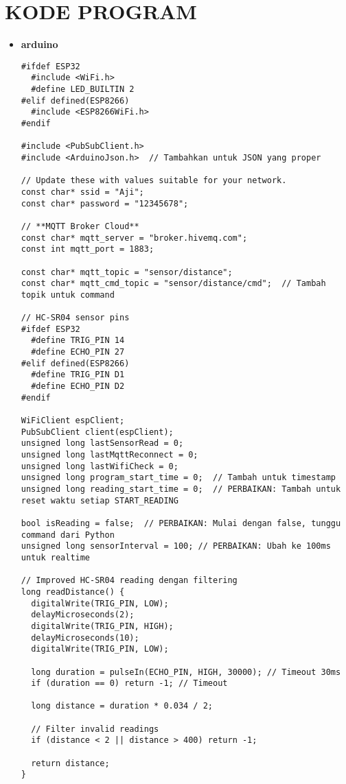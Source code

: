 \chapter{KODE PROGRAM}
\begin{itemize}
   \item \textbf{arduino}
   \begin{scriptsize}
    \begin{lstlisting}[language=Arduino]
       #ifdef ESP32
  #include <WiFi.h>
  #define LED_BUILTIN 2
#elif defined(ESP8266)
  #include <ESP8266WiFi.h>
#endif

#include <PubSubClient.h>
#include <ArduinoJson.h>  // Tambahkan untuk JSON yang proper

// Update these with values suitable for your network.
const char* ssid = "Aji";
const char* password = "12345678";

// **MQTT Broker Cloud**
const char* mqtt_server = "broker.hivemq.com";
const int mqtt_port = 1883;

const char* mqtt_topic = "sensor/distance";
const char* mqtt_cmd_topic = "sensor/distance/cmd";  // Tambah topik untuk command

// HC-SR04 sensor pins
#ifdef ESP32
  #define TRIG_PIN 14
  #define ECHO_PIN 27
#elif defined(ESP8266)
  #define TRIG_PIN D1
  #define ECHO_PIN D2
#endif

WiFiClient espClient;
PubSubClient client(espClient);
unsigned long lastSensorRead = 0;
unsigned long lastMqttReconnect = 0;
unsigned long lastWifiCheck = 0;
unsigned long program_start_time = 0;  // Tambah untuk timestamp
unsigned long reading_start_time = 0;  // PERBAIKAN: Tambah untuk reset waktu setiap START_READING

bool isReading = false;  // PERBAIKAN: Mulai dengan false, tunggu command dari Python
unsigned long sensorInterval = 100; // PERBAIKAN: Ubah ke 100ms untuk realtime

// Improved HC-SR04 reading dengan filtering
long readDistance() {
  digitalWrite(TRIG_PIN, LOW);
  delayMicroseconds(2);
  digitalWrite(TRIG_PIN, HIGH);
  delayMicroseconds(10);
  digitalWrite(TRIG_PIN, LOW);
  
  long duration = pulseIn(ECHO_PIN, HIGH, 30000); // Timeout 30ms
  if (duration == 0) return -1; // Timeout
  
  long distance = duration * 0.034 / 2;
  
  // Filter invalid readings
  if (distance < 2 || distance > 400) return -1;
  
  return distance;
}


\end{lstlisting}
\end{scriptsize}
\end{itemize}
